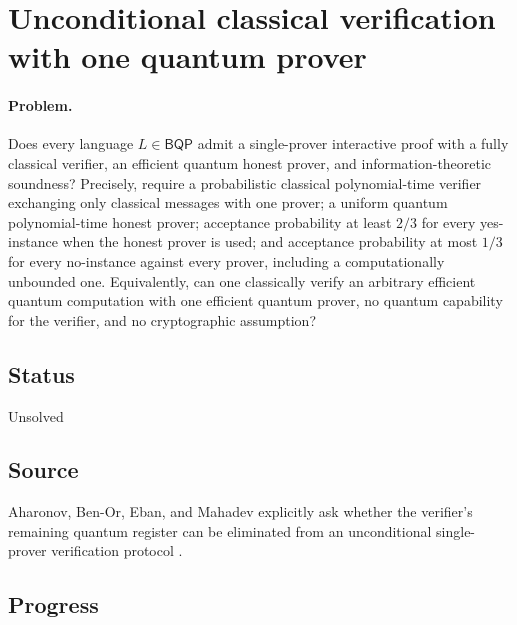 \section{Unconditional classical verification with one quantum prover}
\label{sec:op_3770ad932d54692f}

\paragraph{Problem.}
Does every language $L\in\mathsf{BQP}$ admit a single-prover interactive proof
with a fully classical verifier, an efficient quantum honest prover, and
information-theoretic soundness?  Precisely, require a probabilistic classical
polynomial-time verifier exchanging only classical messages with one prover;
a uniform quantum polynomial-time honest prover; acceptance probability at
least $2/3$ for every yes-instance when the honest prover is used; and
acceptance probability at most $1/3$ for every no-instance against every
prover, including a computationally unbounded one.  Equivalently, can one
classically verify an arbitrary efficient quantum computation with one
efficient quantum prover, no quantum capability for the verifier, and no
cryptographic assumption?

\subsection*{Status}

Unsolved

\subsection*{Source}

Aharonov, Ben-Or, Eban, and Mahadev explicitly ask whether the verifier's
remaining quantum register can be eliminated from an unconditional
single-prover verification protocol
.

\subsection*{Progress}


